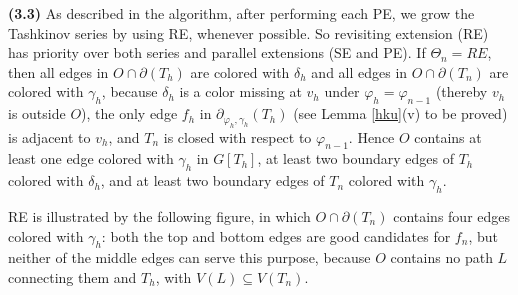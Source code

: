 \documentclass[11pt]{article}
\newcommand{\phiv}{\varphi}
\begin{document}
{\bf (3.3)}  As described in the algorithm, after performing each PE, we grow the Tashkinov series by using RE, whenever possible. 
So revisiting extension (RE) has priority over both series and parallel extensions (SE and PE). If $\Theta_n=RE$, then all edges
in $O \cap \partial(T_h)$ are colored with $\delta_h$ and all edges in $O \cap \partial(T_n)$ are colored with $\gamma_h$, 
because $\delta_h$ is a color missing at $v_h$ under $\phiv_{h}=\varphi_{n-1}$ (thereby $v_h$ is outside $O$), the only edge
$f_h$ in $\partial_{\varphi_h, \gamma_h}(T_h)$ (see Lemma \ref{hku}(v) to be proved) is adjacent to $v_h$, and $T_n$ is closed with 
respect to $\varphi_{n-1}$. Hence $O$ contains at least one edge colored with $\gamma_h$ in $G[T_h]$, at least two boundary edges of 
$T_h$ colored with $\delta_h$, and at least two boundary edges of $T_n$ colored with $\gamma_h$. 

RE is illustrated by the following figure, in which $O \cap \partial(T_n)$ contains four edges colored with $\gamma_h$: both the top and
bottom edges are good candidates for $f_n$, but neither of the middle edges can serve this purpose, because $O$ contains no path $L$ 
connecting them and $T_h$, with $V(L) \subseteq V(T_n)$.
\end{document}
